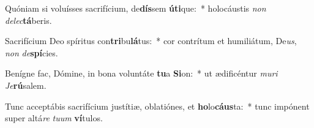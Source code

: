 \item Quóniam si voluísses sacrifícium, de\textbf{dís}sem \textbf{ú}\textbf{ti}que:~* holocáustis \textit{non} \textit{de}\textit{lec}\textbf{tá}beris.
\item Sacrifícium Deo spíritus con\textbf{tri}bu\textbf{lá}tus:~* cor contrítum et humiliátum, De\textit{us}, \textit{non} \textit{de}\textbf{spí}cies.
\item Benígne fac, Dómine, in bona voluntáte \textbf{tu}a \textbf{Si}on:~* ut ædificéntur \textit{mu}\textit{ri} \textit{Je}\textbf{rú}salem.
\item Tunc acceptábis sacrifícium justítiæ, oblatiónes, et \textbf{ho}lo\textbf{cáus}ta:~* tunc impónent super altá\textit{re} \textit{tu}\textit{um} \textbf{ví}tulos.
